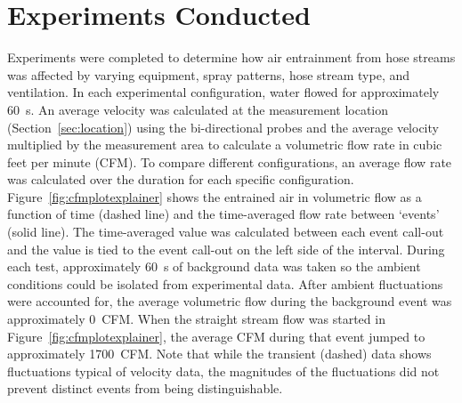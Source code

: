 \documentclass[12pt,oneside]{book}
\begin{document}



\chapter{Experiments Conducted}

Experiments were completed to determine how air entrainment from hose streams was affected by varying equipment, spray patterns, hose stream type, and ventilation. In each experimental configuration, water flowed for approximately 60~s. An average velocity was calculated at the measurement location (Section~\ref{sec:location}) using the bi-directional probes and the average velocity multiplied by the measurement area to calculate a volumetric flow rate in cubic feet per minute (CFM). To compare different configurations, an average flow rate was calculated over the duration for each specific configuration. Figure~\ref{fig:cfmplotexplainer} shows the entrained air in volumetric flow as a function of time (dashed line) and the time-averaged flow rate between `events' (solid line). The time-averaged value was calculated between each event call-out and the value is tied to the event call-out on the left side of the interval. During each test, approximately 60~s of background data was taken so the ambient conditions could be isolated from experimental data. After ambient fluctuations were accounted for, the average volumetric flow during the background event was approximately 0~CFM. When the straight stream flow was started in Figure~\ref{fig:cfmplotexplainer}, the average CFM during that event jumped to approximately 1700~CFM. Note that while the transient (dashed) data shows fluctuations typical of velocity data, the magnitudes of the fluctuations did not prevent distinct events from being distinguishable.
\end{document}
